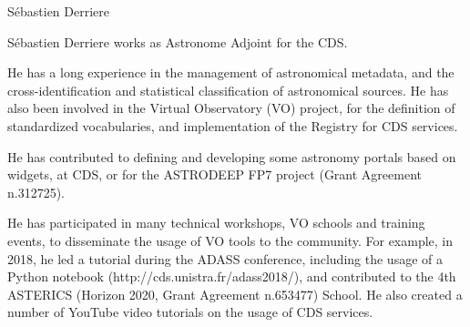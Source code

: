 \begin{participant}[type=R,PM=3,gender=male]{S\'ebastien Derriere}




  \par S\'ebastien Derriere works as Astronome Adjoint for the CDS.

  \par He has a long experience in the management of astronomical metadata, and the cross-identification and statistical classification of astronomical sources. He has also been involved in the Virtual Observatory (VO) project, for the definition of standardized vocabularies, and implementation of the Registry for CDS services.

  \par He has contributed to defining and developing some astronomy portals based on widgets, at CDS, or for the ASTRODEEP FP7 project (Grant Agreement n.312725).

  \par He has participated in many technical workshops, VO schools and training events, to disseminate the usage of VO tools to the community. For example, in 2018, he led a tutorial during the ADASS conference, including the usage of a Python notebook (http://cds.unistra.fr/adass2018/), and contributed to the 4th ASTERICS (Horizon 2020,  Grant Agreement n.653477) School. He also created a number of YouTube video tutorials on the usage of CDS services.

\end{participant}

